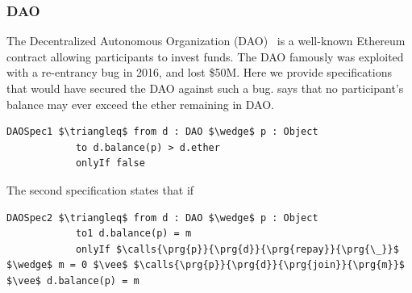 \subsubsection{DAO}
The Decentralized Autonomous Organization (DAO)~\cite{Dao}  is a well-known Ethereum contract allowing 
participants to invest funds. The DAO famously was exploited with a re-entrancy bug in 2016, 
and lost \$50M. Here we provide specifications that would have secured the DAO against such a 
bug.  says that no participant's balance may ever exceed the ether remaining 
in DAO.
\begin{lstlisting}[language = Chainmail, mathescape=true, frame=lines]
DAOSpec1 $\triangleq$ from d : DAO $\wedge$ p : Object
            to d.balance(p) > d.ether
            onlyIf false
\end{lstlisting}
The second specification  states that if 
\begin{lstlisting}[language = Chainmail, mathescape=true, frame=lines]
DAOSpec2 $\triangleq$ from d : DAO $\wedge$ p : Object
            to1 d.balance(p) = m
            onlyIf $\calls{\prg{p}}{\prg{d}}{\prg{repay}}{\prg{\_}}$ $\wedge$ m = 0 $\vee$ $\calls{\prg{p}}{\prg{d}}{\prg{join}}{\prg{m}}$ $\vee$ d.balance(p) = m
\end{lstlisting}
